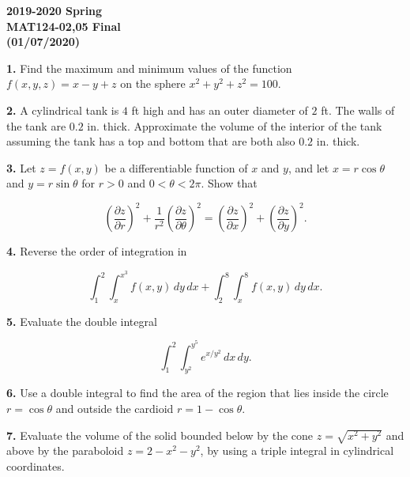 \documentclass{article}
\begin{document}
\pagestyle{empty}
\large

\begin{center}
\textbf{2019-2020 Spring \\MAT124-02,05 Final\\(01/07/2020)}
\end{center}

\textbf{1.} Find the maximum and minimum values of the function $f(x,y,z)=x-y+z$ on the sphere $x^2+y^2+z^2=100$.

\vspace{1em}

\textbf{2.} A cylindrical tank is $4$ ft high and has an outer diameter of $2$ ft. The walls of the tank are $0.2$ in. thick. Approximate the volume of the interior of the tank assuming the tank has a top and bottom that are both also $0.2$ in. thick.

\vspace{1em}

\textbf{3.} Let $z=f(x,y)$ be a differentiable function of $x$ and $y$, and let $x=r\cos\theta$ and $y=r\sin\theta$ for $r>0$ and $0<\theta<2\pi$. Show that

\[\left(\frac{\partial z}{\partial r}\right)^2+\frac1{r^2}\left(\frac{\partial z}{\partial\theta}\right)^2=\left(\frac{\partial z}{\partial x}\right)^2+\left(\frac{\partial z}{\partial y}\right)^2.\]

\vspace{1em}

\textbf{4.} Reverse the order of integration in

\[\displaystyle\int_1^2\int_x^{x^3}f(x,y)\,dy\,dx+\int_2^8\int_x^8f(x,y)\,dy\,dx.\]

\vspace{1em}

\textbf{5.} Evaluate the double integral

\[\int_1^2\int_{y^2}^{y^5}{e}^{x/y^2}\,dx\,dy.\]

\vspace{1em}

\textbf{6.} Use a double integral to find the area of the region that lies inside the circle $r=\cos\theta$ and outside the cardioid $r=1-\cos\theta$.

\vspace{1em}

\textbf{7.} Evaluate the volume of the solid bounded below by the cone $z=\sqrt{x^2+y^2}$ and above by the paraboloid $z=2-x^2-y^2$, by using a triple integral in cylindrical coordinates.
\end{document}
